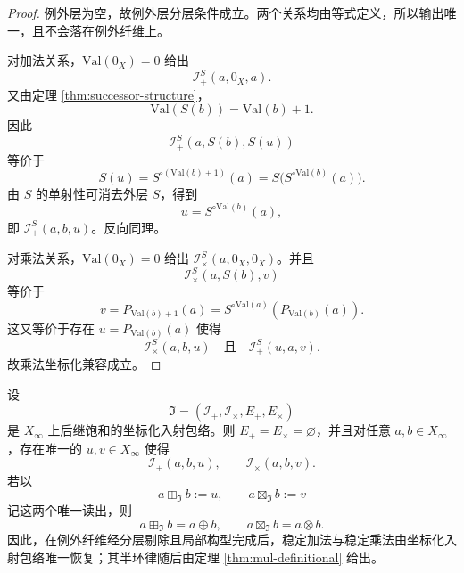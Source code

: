 \begin{proof}
例外层为空，故例外层分层条件成立。两个关系均由等式定义，所以输出唯一，且不会落在例外纤维上。

对加法关系，$\mathrm{Val}(0_X)=0$ 给出
\[
\mathcal I_+^S(a,0_X,a).
\]
又由定理 \ref{thm:successor-structure}，
\[
\mathrm{Val}(S(b))=\mathrm{Val}(b)+1.
\]
因此
\[
\mathcal I_+^S(a,S(b),S(u))
\]
等价于
\[
S(u)=S^{\circ(\mathrm{Val}(b)+1)}(a)=S\bigl(S^{\circ\mathrm{Val}(b)}(a)\bigr).
\]
由 $S$ 的单射性可消去外层 $S$，得到
\[
u=S^{\circ\mathrm{Val}(b)}(a),
\]
即 $\mathcal I_+^S(a,b,u)$。反向同理。

对乘法关系，$\mathrm{Val}(0_X)=0$ 给出 $\mathcal I_\times^S(a,0_X,0_X)$。并且
\[
\mathcal I_\times^S(a,S(b),v)
\]
等价于
\[
v=P_{\mathrm{Val}(b)+1}(a)=S^{\circ\mathrm{Val}(a)}(P_{\mathrm{Val}(b)}(a)).
\]
这又等价于存在 $u=P_{\mathrm{Val}(b)}(a)$ 使得
\[
\mathcal I_\times^S(a,b,u)
\quad\text{且}\quad
\mathcal I_+^S(u,a,v).
\]
故乘法坐标化兼容成立。
\end{proof}

\begin{theorem}[坐标化入射包络的读出刚性]\label{distill:hrushovski_zilber_zariski_geometries_and_elekes_szabo_group_extraction-arithmetic_from_coordinatized_geometry-coordinatized-readout-rigidity}
设
\[
\mathfrak I=(\mathcal I_+,\mathcal I_\times,E_+,E_\times)
\]
是 $X_\infty$ 上后继饱和的坐标化入射包络。则 $E_+=E_\times=\varnothing$，并且对任意 $a,b\in X_\infty$，存在唯一的 $u,v\in X_\infty$ 使得
\[
\mathcal I_+(a,b,u),
\qquad
\mathcal I_\times(a,b,v).
\]
若以
\[
a\boxplus_{\mathfrak I} b:=u,
\qquad
a\boxtimes_{\mathfrak I} b:=v
\]
记这两个唯一读出，则
\[
a\boxplus_{\mathfrak I} b=a\oplus b,
\qquad
a\boxtimes_{\mathfrak I} b=a\otimes b.
\]
因此，在例外纤维经分层剔除且局部构型完成后，稳定加法与稳定乘法由坐标化入射包络唯一恢复；其半环律随后由定理 \ref{thm:mul-definitional} 给出。
\end{theorem}

